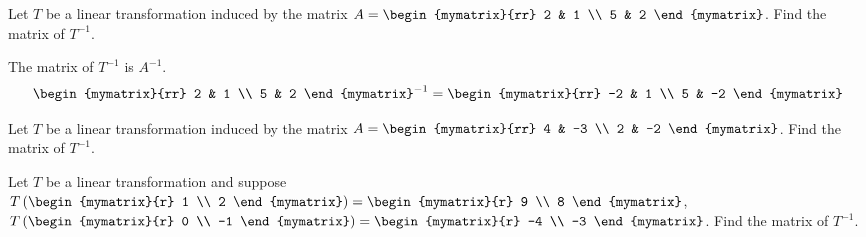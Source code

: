\begin{enumialphparenastyle}
\begin{ex} Let $T$ be a linear transformation induced by the matrix $A = \begin{mymatrix}{rr}
2 & 1 \\
5 & 2 
\end{mymatrix}$. Find the matrix of $T^{-1}$.
\begin{sol}
The matrix of $T^{-1}$ is $A^{-1}$.
\[
\begin{mymatrix}{rr}
2 & 1 \\
5 & 2 
\end{mymatrix} ^{-1} = 
\begin{mymatrix}{rr}
-2 & 1 \\
5 & -2
\end{mymatrix}
\]
\end{sol}
\end{ex}

\begin{ex} Let $T$ be a linear transformation induced by the matrix $A = \begin{mymatrix}{rr}
4 & -3 \\
2 & -2 
\end{mymatrix}$. Find the matrix of $T^{-1}$. 
\end{ex}

\begin{ex} Let $T$ be a linear transformation and suppose $T \tup{\begin{mymatrix}{r}
1 \\
2
\end{mymatrix} } = \begin{mymatrix}{r}
9 \\
8
\end{mymatrix}$, $T \tup{\begin{mymatrix}{r}
0 \\
-1
\end{mymatrix} } = \begin{mymatrix}{r}
-4 \\
-3
\end{mymatrix}$. 
Find the matrix of $T^{-1}$. 
\end{ex}

\end{enumialphparenastyle}

